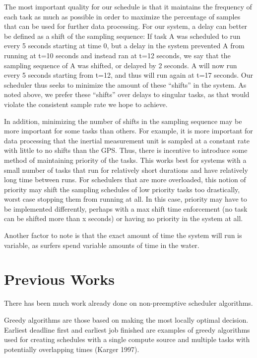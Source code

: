 \documentclass{article}
\begin{document}
The most important quality for our schedule is that it maintains the frequency of each task as much as possible in order to maximize the percentage of samples that can be used for further data processing. For our system, a delay can better be defined as a shift of the sampling sequence: If task A was scheduled to run every 5 seconds starting at time 0, but a delay in the system prevented A from running at t=10 seconds and instead ran at t=12 seconds, we say that the sampling sequence of A was shifted, or delayed by 2 seconds. A will now run every 5 seconds starting from t=12, and thus will run again at t=17 seconds. Our scheduler thus seeks to minimize the amount of these “shifts” in the system. As noted above, we prefer these “shifts” over delays to singular tasks, as that would violate the consistent sample rate we hope to achieve. 


In addition, minimizing the number of shifts in the sampling sequence may be more important for some tasks than others. For example, it is more important for data processing that the inertial measurement unit is sampled at a constant rate with little to no shifts than the GPS. Thus, there is incentive to introduce some method of maintaining priority of the tasks. This works best for systems with a small number of tasks that run for relatively short durations and have relatively long time between runs. For schedulers that are more overloaded, this notion of priority may shift the sampling schedules of low priority tasks too drastically, worst case stopping them from running at all. In this case, priority may have to be implemented differently, perhaps with a max shift time enforcement (no task can be shifted more than x seconds) or having no priority in the system at all. 

Another factor to note is that the exact amount of time the system will run is variable, as surfers spend variable amounts of time in the water. 

\section{Previous Works}
There has been much work already done on non-preemptive scheduler algorithms. \newline

Greedy algorithms are those based on making the most locally optimal decision. Earliest deadline first and earliest job finished are examples of greedy algorithms used for creating schedules with a single compute source and multiple tasks with potentially overlapping times (Karger 1997). \newline
\end{document}
